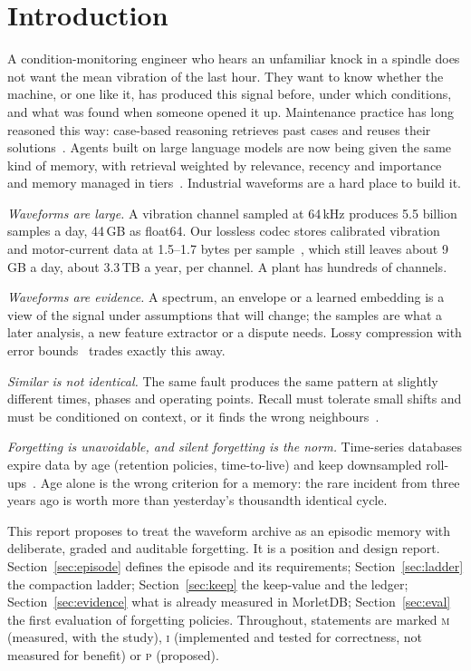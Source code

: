\documentclass[sigconf,nonacm]{acmart}
\newcommand{\M}{MorletDB}
\newcommand{\meas}{\textsc{m}}
\newcommand{\impl}{\textsc{i}}
\newcommand{\prop}{\textsc{p}}
\begin{document}
\maketitle

\section{Introduction}
A condition-monitoring engineer who hears an unfamiliar knock in a spindle does not want the mean vibration of the last hour. They want to know whether the machine, or one like it, has produced this signal before, under which conditions, and what was found when someone opened it up. Maintenance practice has long reasoned this way: case-based reasoning retrieves past cases and reuses their solutions~\cite{aamodt1994}. Agents built on large language models are now being given the same kind of memory, with retrieval weighted by relevance, recency and importance~\cite{park2023generative} and memory managed in tiers~\cite{packer2023memgpt}. Industrial waveforms are a hard place to build it.

\emph{Waveforms are large.} A vibration channel sampled at 64\,kHz produces 5.5 billion samples a day, 44\,GB as float64. Our lossless codec stores calibrated vibration and motor-current data at 1.5--1.7 bytes per sample~\cite{g1,b3}, which still leaves about 9\,GB a day, about 3.3\,TB a year, per channel. A plant has hundreds of channels.

\emph{Waveforms are evidence.} A spectrum, an envelope or a learned embedding is a view of the signal under assumptions that will change; the samples are what a later analysis, a new feature extractor or a dispute needs. Lossy compression with error bounds~\cite{di2016sz,lindstrom2014zfp} trades exactly this away.

\emph{Similar is not identical.} The same fault produces the same pattern at slightly different times, phases and operating points. Recall must tolerate small shifts and must be conditioned on context, or it finds the wrong neighbours~\cite{morletdb}.

\emph{Forgetting is unavoidable, and silent forgetting is the norm.} Time-series databases expire data by age (retention policies, time-to-live) and keep downsampled roll-ups~\cite{rrdtool_rrdcreate,thanos_compactor,timescale_caggs}. Age alone is the wrong criterion for a memory: the rare incident from three years ago is worth more than yesterday's thousandth identical cycle.

This report proposes to treat the waveform archive as an episodic memory with deliberate, graded and auditable forgetting. It is a position and design report. Section~\ref{sec:episode} defines the episode and its requirements; Section~\ref{sec:ladder} the compaction ladder; Section~\ref{sec:keep} the keep-value and the ledger; Section~\ref{sec:evidence} what is already measured in \M{}; Section~\ref{sec:eval} the first evaluation of forgetting policies. Throughout, statements are marked \meas{} (measured, with the study), \impl{} (implemented and tested for correctness, not measured for benefit) or \prop{} (proposed).
\end{document}
